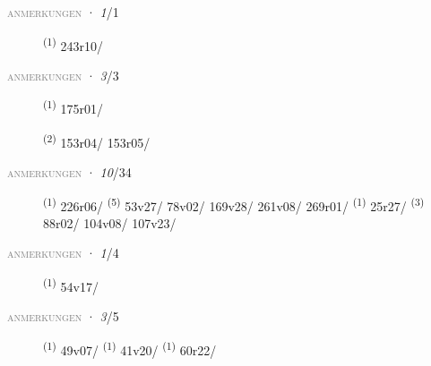 \textsc{\textcolor{gray}{anmerkungen}}
\ENTRYEND
\noindent{} · \textit{1}/1 \LEMMALINE
\begin{description}
    \item[]  \textsuperscript{(1)} \mbox{243r10/}
\end{description}
\textsc{\textcolor{gray}{anmerkungen}}
\ENTRYEND
\noindent{} · \textit{3}/3 \LEMMALINE
\begin{description}
    \item[]  \textsuperscript{(1)} \mbox{175r01/}
    \item[]  \textsuperscript{(2)} \mbox{153r04/} \mbox{153r05/}
\end{description}
\textsc{\textcolor{gray}{anmerkungen}}
\ENTRYEND
\noindent{} · \textit{10}/34 \LEMMALINE
\begin{description}
    \item[]  \textsuperscript{(1)} \mbox{226r06/} \CASEBREAK {} \textsuperscript{(5)} \mbox{53v27/} \mbox{78v02/} \mbox{169v28/} \mbox{261v08/} \mbox{269r01/} \CASEBREAK {} \textsuperscript{(1)} \mbox{25r27/} \CASEBREAK {} \textsuperscript{(3)} \mbox{88r02/} \mbox{104v08/} \mbox{107v23/}
\end{description}
\textsc{\textcolor{gray}{anmerkungen}}
\ENTRYEND
\noindent{} · \textit{1}/4 \LEMMALINE
\begin{description}
    \item[]  \textsuperscript{(1)} \mbox{54v17/}
\end{description}
\textsc{\textcolor{gray}{anmerkungen}}
\ENTRYEND
\noindent{} · \textit{3}/5 \LEMMALINE
\begin{description}
    \item[]  \textsuperscript{(1)} \mbox{49v07/} \CASEBREAK {} \textsuperscript{(1)} \mbox{41v20/} \CASEBREAK {} \textsuperscript{(1)} \mbox{60r22/}
\end{description}
